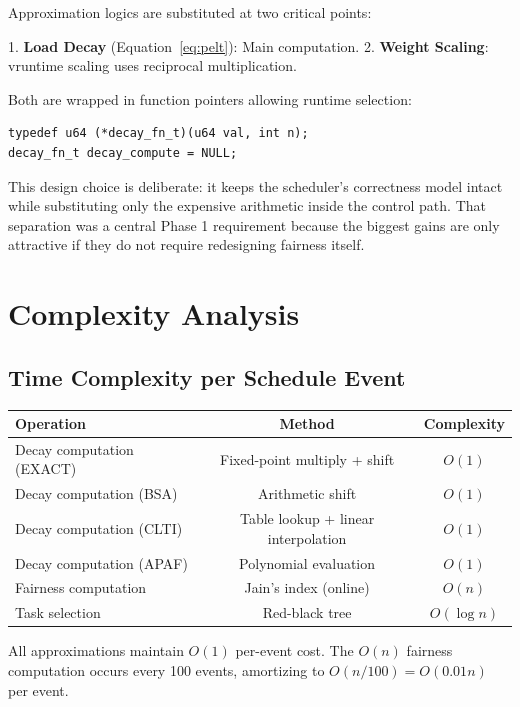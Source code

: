 \documentclass[conference]{IEEEtran}
\begin{document}
Approximation logics are substituted at two critical points:

1. \textbf{Load Decay} (Equation~\ref{eq:pelt}): Main computation.
2. \textbf{Weight Scaling}: vruntime scaling uses reciprocal multiplication.

Both are wrapped in function pointers allowing runtime selection:
\begin{lstlisting}
typedef u64 (*decay_fn_t)(u64 val, int n);
decay_fn_t decay_compute = NULL;
\end{lstlisting}

This design choice is deliberate: it keeps the scheduler's correctness model intact while substituting only the expensive arithmetic inside the control path. That separation was a central Phase 1 requirement because the biggest gains are only attractive if they do not require redesigning fairness itself.

\section{Complexity Analysis}\label{sec:complexity}

\subsection{Time Complexity per Schedule Event}

\begin{table}[H]
\centering
\begin{tabular}{|l|c|c|}
\hline
\textbf{Operation} & \textbf{Method} & \textbf{Complexity} \\
\hline
Decay computation (EXACT) & Fixed-point multiply + shift & $O(1)$ \\
Decay computation (BSA) & Arithmetic shift & $O(1)$ \\
Decay computation (CLTI) & Table lookup + linear interpolation & $O(1)$ \\
Decay computation (APAF) & Polynomial evaluation & $O(1)$ \\
Fairness computation & Jain's index (online) & $O(n)$ \\
Task selection & Red-black tree & $O(\log n)$ \\
\hline
\end{tabular}
\label{tab:complexity}
\end{table}

All approximations maintain $O(1)$ per-event cost. The $O(n)$ fairness computation occurs every 100 events, amortizing to $O(n/100) = O(0.01n)$ per event.
\end{document}
